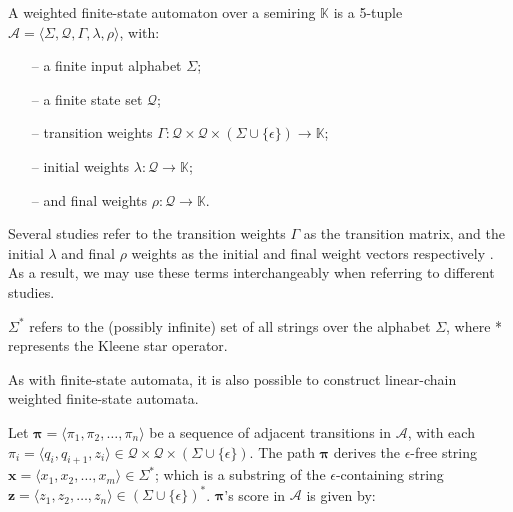 \begin{definition}
  \label{def:wfa}
  A weighted finite-state automaton over a semiring $\mathbb{K}$ is a 5-tuple
  $\mathcal{A} = \langle \Sigma, \mathcal{Q}, \Gamma, \lambda, \rho \rangle$,
  with:

  \begin{itemize}
    \itemsep0em
    \item[--] a finite input alphabet $\Sigma$;
    \item[--] a finite state set $\mathcal{Q}$;
    \item[--] transition weights $\Gamma: \mathcal{Q} \times \mathcal{Q} \times
    (\Sigma \cup \{\epsilon\}) \rightarrow \mathbb{K}$;
    \item[--] initial weights $\lambda: \mathcal{Q} \rightarrow \mathbb{K}$;
    \item[--] and final weights $\rho: \mathcal{Q} \rightarrow \mathbb{K}$.
  \end{itemize}

  \begin{remark}
    Several studies refer to the transition weights $\Gamma$ as the transition
    matrix, and the initial $\lambda$ and final $\rho$ weights as the initial
    and final weight vectors respectively
    \citep{schwartz2018sopa,jiang2020cold}. As a result, we may use these terms
    interchangeably when referring to different studies.
  \end{remark}
 
  \begin{remark}
    $\Sigma^{*}$ refers to the (possibly infinite) set of all strings over the
    alphabet $\Sigma$, where * represents the Kleene star operator.
  \end{remark}

  \begin{remark}
    As with finite-state automata, it is also possible to construct linear-chain
    weighted finite-state automata.
  \end{remark}
  
\end{definition}

\begin{definition}

  Let $\pmb{\pi} = \langle \pi_1, \pi_2, \dots, \pi_n \rangle$ be a sequence of
  adjacent transitions in $\mathcal{A}$, with each $\pi_i = \langle q_i,
  q_{i+1}, z_i \rangle \in \mathcal{Q} \times \mathcal{Q} \times (\Sigma \cup
  \{\epsilon\})$. The path $\pmb{\pi}$ derives the $\epsilon$-free string
  $\pmb{x} = \langle x_1, x_2, \dots, x_m \rangle \in \Sigma^{*}$; which is a
  substring of the $\epsilon$-containing string $\pmb{z} = \langle z_1, z_2,
  \dots, z_n \rangle \in (\Sigma \cup \{\epsilon\})^{*}$. $\pmb{\pi}$'s score in
  $\mathcal{A}$ is given by:
  
\end{definition}

